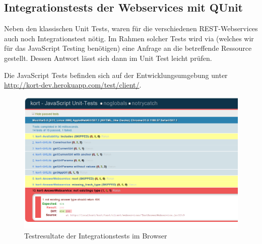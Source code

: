 \subsection{Integrationstests der Webservices mit QUnit}
Neben den klassischen Unit Tests, waren für die verschiedenen \gls{REST}-Webservices auch noch Integrationstest nötig.
Im Rahmen solcher Tests wird via  (welches wir für das JavaScript Testing benötigen) eine Anfrage an die betreffende Ressource gestellt.
Dessen Antwort lässt sich dann im Unit Test leicht prüfen.

Die JavaScript Tests befinden sich auf der Entwicklungsumgebung unter \url{http://kort-dev.herokuapp.com/test/client/}.

\begin{figure}[H]
	\centering
	\includegraphics[width=\textwidth]{images/implementation/backend/qunit-skipped-test}
	\caption{Testresultate der Integrationstests im Browser}
	\label{image-qunit-skipped-test}
\end{figure}